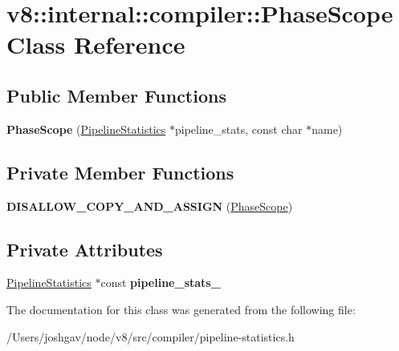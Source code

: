 \hypertarget{classv8_1_1internal_1_1compiler_1_1_phase_scope}{}\section{v8\+:\+:internal\+:\+:compiler\+:\+:Phase\+Scope Class Reference}
\label{classv8_1_1internal_1_1compiler_1_1_phase_scope}
\subsection*{Public Member Functions}
\begin{DoxyCompactItemize}
\item 
{\bfseries Phase\+Scope} (\hyperlink{classv8_1_1internal_1_1compiler_1_1_pipeline_statistics}{Pipeline\+Statistics} $\ast$pipeline\+\_\+stats, const char $\ast$name)\hypertarget{classv8_1_1internal_1_1compiler_1_1_phase_scope_a24b1a97bcb70ca49dbdc374ac5efa322}{}\label{classv8_1_1internal_1_1compiler_1_1_phase_scope_a24b1a97bcb70ca49dbdc374ac5efa322}

\end{DoxyCompactItemize}
\subsection*{Private Member Functions}
\begin{DoxyCompactItemize}
\item 
{\bfseries D\+I\+S\+A\+L\+L\+O\+W\+\_\+\+C\+O\+P\+Y\+\_\+\+A\+N\+D\+\_\+\+A\+S\+S\+I\+GN} (\hyperlink{classv8_1_1internal_1_1compiler_1_1_phase_scope}{Phase\+Scope})\hypertarget{classv8_1_1internal_1_1compiler_1_1_phase_scope_a6edaf66b9e901d2ba348d8add9884bd6}{}\label{classv8_1_1internal_1_1compiler_1_1_phase_scope_a6edaf66b9e901d2ba348d8add9884bd6}

\end{DoxyCompactItemize}
\subsection*{Private Attributes}
\begin{DoxyCompactItemize}
\item 
\hyperlink{classv8_1_1internal_1_1compiler_1_1_pipeline_statistics}{Pipeline\+Statistics} $\ast$const {\bfseries pipeline\+\_\+stats\+\_\+}\hypertarget{classv8_1_1internal_1_1compiler_1_1_phase_scope_a852dc207dec030a62000a94569f37e27}{}\label{classv8_1_1internal_1_1compiler_1_1_phase_scope_a852dc207dec030a62000a94569f37e27}

\end{DoxyCompactItemize}


The documentation for this class was generated from the following file\+:\begin{DoxyCompactItemize}
\item 
/\+Users/joshgav/node/v8/src/compiler/pipeline-\/statistics.\+h\end{DoxyCompactItemize}
